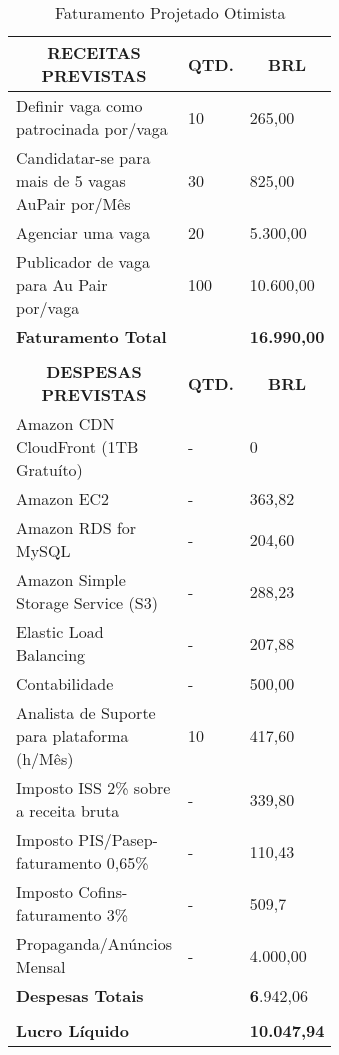 \begin{enumerate}
    \begin{table}[H]
    \caption{Faturamento Projetado Otimista}
    \label{faturamento-projetado-otimista}
    	\centering\footnotesize
        \begin{tabular}{|p{0.50\linewidth} | p{0.04\linewidth} |  p{0.10\linewidth} |}  \hline

        \multicolumn{1}{|c|}{\textbf{RECEITAS PREVISTAS}} &
        \multicolumn{1}{|c|}{\textbf{QTD.}} &
        \multicolumn{1}{|c|}{\textbf{BRL}} \\ \hline


    Definir vaga como patrocinada por/vaga  & 10 & 265,00      \\ \hline
    Candidatar-se para mais de 5 vagas AuPair por/Mês     &  30 & 825,00     \\ \hline
    Agenciar uma vaga             &  20  & 5.300,00         \\ \hline
    Publicador de vaga para Au Pair por/vaga     & 100  &   10.600,00     \\ \hline
    {\textbf{Faturamento Total}}   &   &   {\textbf{16.990,00}}           \\  \hline 


    &   &        \\ \hline
    \multicolumn{1}{|c|}{\textbf{DESPESAS PREVISTAS}} &
    \multicolumn{1}{|c|}{\textbf{QTD.}} &
    \multicolumn{1}{|c|}{\textbf{BRL}} \\ \hline

    Amazon CDN CloudFront (1TB Gratuíto) & - & 0 \\ \hline 
    Amazon EC2 & - & 363,82\\ \hline
    Amazon RDS for MySQL & - & 204,60 \\ \hline
    Amazon Simple Storage Service (S3) & - & 288,23 \\ \hline
    Elastic Load Balancing & - & 207,88 \\ \hline
    Contabilidade & - & 500,00 \\ \hline
    Analista de Suporte para plataforma (h/Mês) & 10 & 417,60  \\ \hline
    Imposto ISS 2\% sobre a receita bruta & - & 339,80  \\ \hline
    Imposto PIS/Pasep-faturamento 0,65\% & - & 110,43  \\ \hline
    Imposto Cofins-faturamento 3\% & - & 509,7  \\ \hline
    Propaganda/Anúncios Mensal    & - &  4.000,00  \\ \hline
    
    
    {\textbf{Despesas Totais}}   &   &   {\textbf6.942,06}}           \\  \hline 


        & &   \\  \hline   
    {\textbf{Lucro Líquido}}   &   &   {\textbf{10.047,94}}           \\  \hline 

        \end{tabular}
    \end{table}
\end{enumerate}

